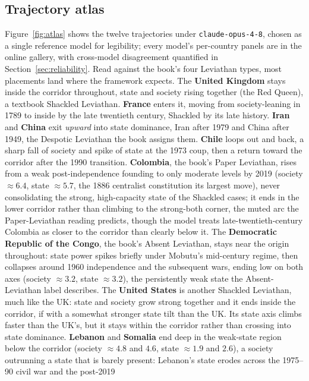 \documentclass[twocolumn,10pt]{article}
\begin{document}
\subsection{Trajectory atlas}
\label{sec:atlas}
Figure~\ref{fig:atlas} shows the twelve trajectories under \texttt{claude-opus-4-8},
chosen as a single reference model for legibility; every model's per-country
panels are in the online gallery, with cross-model disagreement quantified in
Section~\ref{sec:reliability}. Read against the book's four Leviathan types, most
placements land where the framework expects. The \textbf{United Kingdom} stays
inside the corridor throughout, state and society rising together (the Red
Queen), a textbook Shackled Leviathan. \textbf{France} enters it, moving from
society-leaning in 1789 to inside by the late twentieth century, Shackled by its
late history. \textbf{Iran} and \textbf{China} exit \emph{upward} into state
dominance, Iran after 1979 and China after 1949, the Despotic Leviathan the book
assigns them. \textbf{Chile} loops out and back, a sharp fall of society and
spike of state at the 1973 coup, then a return toward the corridor after the 1990
transition. \textbf{Colombia}, the book's Paper Leviathan, rises from a weak post-independence
founding to only moderate levels by 2019 (society $\approx6.4$, state
$\approx5.7$, the 1886 centralist constitution its largest move), never
consolidating the strong, high-capacity state of the Shackled cases; it ends in
the lower corridor rather than climbing to the strong-both corner, the muted arc
the Paper-Leviathan reading predicts, though the model treats late-twentieth-century
Colombia as closer to the corridor than clearly below it. The \textbf{Democratic
Republic of the Congo}, the book's Absent Leviathan, stays near the origin
throughout: state power spikes briefly under Mobutu's mid-century regime, then
collapses around 1960 independence and the subsequent wars, ending low on both
axes (society $\approx3.2$, state $\approx3.2$), the persistently weak state the
Absent-Leviathan label describes. The \textbf{United States} is another
Shackled Leviathan, much like the UK: state and society grow strong together and
it ends inside the corridor, if with a somewhat stronger state tilt than the UK.
Its state axis climbs faster than the UK's, but it stays within the corridor
rather than crossing into state dominance. \textbf{Lebanon} and \textbf{Somalia}
end deep in the weak-state region below the corridor (society $\approx4.8$ and
$4.6$, state $\approx1.9$ and $2.6$), a society outrunning a state that is barely
present: Lebanon's state erodes across the 1975--90 civil war and the post-2019
\end{document}
